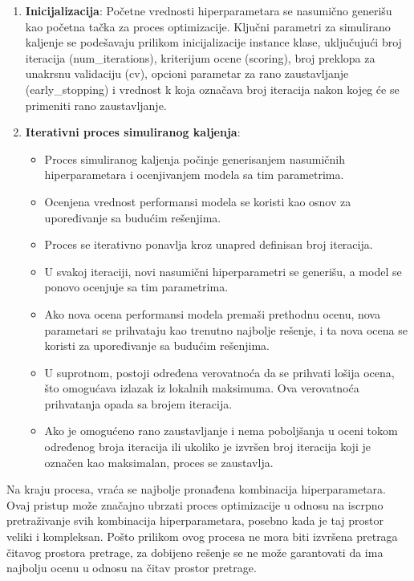 \documentclass{article}
\begin{document}
\begin{enumerate}
    \item \textbf{Inicijalizacija}: Početne vrednosti hiperparametara se nasumično generišu kao početna tačka za proces optimizacije. Ključni parametri za simulirano kaljenje se podešavaju prilikom inicijalizacije instance klase, uključujući broj iteracija (num\_iterations), kriterijum ocene (scoring), broj preklopa za unakrsnu validaciju (cv), opcioni parametar za rano zaustavljanje (early\_stopping) i vrednost k koja označava broj iteracija nakon kojeg će se primeniti rano zaustavljanje.
    \item \textbf{Iterativni proces simuliranog kaljenja}:
        \begin{itemize}
            \item Proces simuliranog kaljenja počinje generisanjem nasumičnih hiperparametara i ocenjivanjem modela sa tim parametrima.
            \item Ocenjena vrednost performansi modela se koristi kao osnov za upoređivanje sa budućim rešenjima.
            \item Proces se iterativno ponavlja kroz unapred definisan broj iteracija.
            \item U svakoj iteraciji, novi nasumični hiperparametri se generišu, a model se ponovo ocenjuje sa tim parametrima.
            \item Ako nova ocena performansi modela premaši prethodnu ocenu, nova parametari se prihvataju kao trenutno najbolje rešenje, i ta nova ocena se koristi za upoređivanje sa budućim rešenjima.
            \item U suprotnom, postoji određena verovatnoća da se prihvati lošija ocena, što omogućava izlazak iz lokalnih maksimuma. Ova verovatnoća prihvatanja opada sa brojem iteracija.
            \item Ako je omogućeno rano zaustavljanje i nema poboljšanja u oceni tokom određenog broja iteracija ili ukoliko je izvršen broj iteracija koji je označen kao maksimalan, proces se zaustavlja.
        \end{itemize}
\end{enumerate}
Na kraju procesa, vraća se najbolje pronađena kombinacija hiperparametara. Ovaj pristup može značajno ubrzati proces optimizacije u odnosu na iscrpno pretraživanje svih kombinacija hiperparametara, posebno kada je taj prostor veliki i kompleksan. Pošto prilikom ovog procesa ne mora biti izvršena pretraga čitavog prostora pretrage, za dobijeno rešenje se ne može garantovati da ima najbolju ocenu u odnosu na čitav prostor pretrage.
\end{document}
